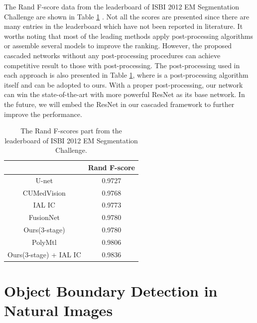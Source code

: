 \documentclass[senior]{IPSstyle}
\begin{document}
The Rand F-score data from the leaderboard of ISBI 2012 EM Segmentation Challenge are shown in Table \ref{isbi12 fscore} . Not all the scores are presented since there are many entries in the leaderboard which have not been reported in literature. It worths noting that most of the leading methods apply post-processing algorithms or assemble several models to improve the ranking. However, the proposed cascaded networks without any post-processing procedures can achieve competitive result to those with post-processing. 
The post-processing used in each approach is also presented in Table \ref{isbi12 fscore}, where \cite{Beier2016} is a post-processing algorithm itself and can be adopted to ours. With a proper post-processing, our network can win the state-of-the-art with more powerful ResNet\cite{He2016} as its base network. In the future, we will embed the ResNet\cite{He2016} in our cascaded framework to further improve the performance.


\begin{table}[t]
\renewcommand{\arraystretch}{0.8}
\caption{The Rand F-scores part from the leaderboard of ISBI 2012 EM Segmentation Challenge\cite{Ronneberger2015}.}
\label{outcome}
\begin{center}
\begin{tabular}{|c|c|}
\hline
&\multicolumn{1}{c|}{Rand F-score}\\
\hline
U-net\cite{Ronneberger2015} 			& 0.9727	\\	\hline
CUMedVision\cite{Chen2016} 			& 0.9768 	\\	\hline
IAL IC\cite{Beier2016}			& 0.9773	 \\	\hline
FusionNet\cite{Quan2016} 			& 0.9780	\\	\hline
Ours(3-stage) 			& 0.9780	\\	\hline
PolyMtl\cite{Drozdzal2017} 			& 0.9806	\\	\hline
Ours(3-stage) + IAL IC			& 0.9836	\\	\hline
\end{tabular}
\end{center}
\label{isbi12 fscore}
\end{table}



\section{Object Boundary Detection in Natural Images}
\end{document}
